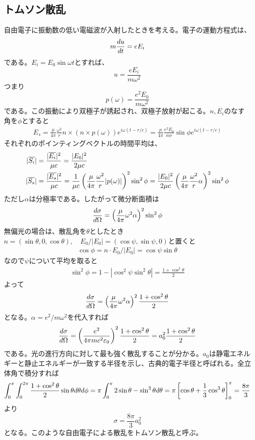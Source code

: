 \subsection{トムソン散乱}
    自由電子に振動数の低い電磁波が入射したときを考える。電子の運動方程式は、
        \[m\de[u]{t} = eE_i\]
    である。$E_i = E_0\sin\omega t$とすれば、
        \[u = \frac{eE_i}{m\omega^2}\]
    つまり
        \[p(\omega) = \frac{e^2E_0}{m\omega^2}\]
    である。この振動により双極子が誘起され、双極子放射が起こる。$n,E_i$のなす角を$\phi$とすると
    \begin{align*}
        E_s = \frac{\mu}{4\pi}\frac{\omega^2}{r}{n\times(n\times p(\omega))}e^{i\omega(t - r/c)} = \frac{\mu}{4\pi}\frac{e^2E_0}{mr}\sin\phi e^{i\omega(t - r/c)}
    \end{align*}
    それぞれのポインティングベクトルの時間平均は、
    \begin{align*}
        |\overline{S_i}| &= \frac{|\overline{E_i}|^2}{\mu c} = \frac{|E_0|^2}{2\mu c}\\
        |\overline{S_s}| &= \frac{|\overline{E_s}|^2}{\mu c} = \frac{1}{\mu c}\lr{\frac{\mu}{4\pi}\frac{\omega^2}{r}|p(\omega)|}^2\sin^2\phi = \frac{|E_0|^2}{2\mu c}\lr{\frac{\mu}{4\pi}\frac{\omega^2}{r}\alpha}^2\sin^2\phi
    \end{align*}
    ただし$\alpha$は分極率である。したがって微分断面積は
    \begin{align*}
        \de[\sigma]{\Omega} = \lr{\frac{\mu}{4\pi}\omega^2\alpha}^2\sin^2\phi           
    \end{align*}
    無偏光の場合は、散乱角を$\theta$としたとき$n = (\sin\theta, 0, \cos\theta), \quad E_0 / |E_0| = (\cos\psi, \sin\psi, 0)$と置くと
    \begin{align*}
        \cos\phi = n \cdot E_0 / |E_0| = \cos\psi\sin\theta
    \end{align*}
    なので$\psi$について平均を取ると
    \begin{align*}
        \sin^2\phi = 1 - |\cos^2\psi\sin^2\theta| = \frac{1 + \cos^2\theta}{2}
    \end{align*}
    よって
    \begin{align*}
        \de[\sigma]{\Omega} = \lr{\frac{\mu}{4\pi}\omega^2\alpha}^2\frac{1 + \cos^2\theta}{2}
    \end{align*}
    となる。$\alpha = e^2 / m\omega^2$を代入すれば
    \begin{align*}
        \de[\sigma]{\Omega} = \lr{\frac{e^2}{4\pi mc^2\epsilon_0}}^2\frac{1 + \cos^2\theta}{2} = a_0^2\frac{1 + \cos^2\theta}{2}
    \end{align*}
    である。光の進行方向に対して最も強く散乱することが分かる。$a_0$は静電エネルギーと静止エネルギーが一致する半径を示し、古典的電子半径と呼ばれる。全立体角で積分すれば
    \begin{align*}
        \int_0^\pi\int_0^{2\pi} \frac{1 + \cos^2\theta}{2}\sin\theta d\theta d\phi = \pi \int_0^\pi 2\sin\theta - \sin^3\theta d\theta = \pi \llr{\cos\theta + \frac{1}{3}\cos^3\theta}_0^\pi = \frac{8\pi}{3}
    \end{align*}
    より
        \[\sigma = \frac{8\pi}{3}a_0^2\]
    となる。このような自由電子による散乱をトムソン散乱と呼ぶ。

